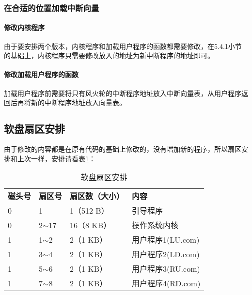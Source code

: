 \documentclass[a4paper, 11pt]{article} %
\begin{document}
\subsubsection{在合适的位置加载中断向量}
\paragraph{修改内核程序}
由于要安排两个版本，内核程序和加载用户程序的函数都需要修改，在5.4.1小节的基础上，内核程序只需要修改放入的地址为新中断程序的地址即可。

\paragraph{修改加载用户程序的函数}
加载用户程序前需要将只有风火轮的中断程序地址放入中断向量表，从用户程序返回后再将新的中断程序地址放入向量表。

\subsection{软盘扇区安排}

由于修改的内容都是在原有代码的基础上修改的，没有增加新的程序，所以扇区安排和上次一样，安排请看表\ref{tab:sectortable}：
\FloatBarrier
\begin{table}[]
\centering
  \caption{软盘扇区安排}
  \label{tab:sectortable}
  \begin{tabular}{llll}
  \rowcolor[HTML]{FFFFFF} 
  {\color[HTML]{333333} \textbf{磁头号}} & {\color[HTML]{333333} \textbf{扇区号}} & {\color[HTML]{333333} \textbf{扇区数（大小）}} & {\color[HTML]{333333} \textbf{内容}} \\
  \rowcolor[HTML]{FFFFFF} 
  {\color[HTML]{333333} 0}            & {\color[HTML]{333333} 1}            & {\color[HTML]{333333} 1（512 B）}         & {\color[HTML]{333333} 引导程序}        \\
  \rowcolor[HTML]{FFFFFF} 
  {\color[HTML]{333333} 0}            & {\color[HTML]{333333} 2$\sim$17}    & {\color[HTML]{333333} 16（8 KB）}         & {\color[HTML]{333333} 操作系统内核}      \\
  \rowcolor[HTML]{F8F8F8} 
  {\color[HTML]{333333} 1}            & {\color[HTML]{333333} 1$\sim$2}     & {\color[HTML]{333333} 2（1 KB）}          & {\color[HTML]{333333} 用户程序1(LU.com)}       \\
  \rowcolor[HTML]{FFFFFF} 
  {\color[HTML]{333333} 1}            & {\color[HTML]{333333} 3$\sim$4}     & {\color[HTML]{333333} 2（1 KB）}          & {\color[HTML]{333333} 用户程序2(LD.com)}       \\
  \rowcolor[HTML]{F8F8F8} 
  {\color[HTML]{333333} 1}            & {\color[HTML]{333333} 5$\sim$6}     & {\color[HTML]{333333} 2（1 KB）}          & {\color[HTML]{333333} 用户程序3(RU.com)}       \\
  \rowcolor[HTML]{FFFFFF} 
  {\color[HTML]{333333} 1}            & {\color[HTML]{333333} 7$\sim$8}     & {\color[HTML]{333333} 2（1 KB）}          & {\color[HTML]{333333} 用户程序4(RD.com)}      
  \end{tabular}
  \end{table}
\end{document}
